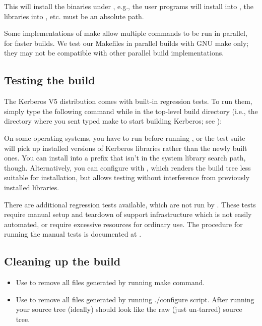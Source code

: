 \documentclass[letterpaper,10pt,english]{sphinxmanual}
\begin{document}
This will install the binaries under , e.g., the user
programs will install into , the libraries into
, etc.   must be an absolute path.

Some implementations of make allow multiple commands to be run in
parallel, for faster builds.  We test our Makefiles in parallel builds
with GNU make only; they may not be compatible with other parallel
build implementations.


\subsection{Testing the build}
\label{\detokenize{build/doing_build:testing-the-build}}
The Kerberos V5 distribution comes with built-in regression tests.  To
run them, simply type the following command while in the top-level
build directory (i.e., the directory where you sent typed make to
start building Kerberos; see {\hyperref[\detokenize{build/doing_build:do-build}]{}}):

%
\begin{sphinxVerbatim}[commandchars=\\\{\}]
 
\end{sphinxVerbatim}

On some operating systems, you have to run  before
running , or the test suite will pick up installed
versions of Kerberos libraries rather than the newly built ones.  You
can install into a prefix that isn’t in the system library search
path, though.  Alternatively, you can configure with
\sphinxstylestrong{-}, which renders the build tree less suitable
for installation, but allows testing without interference from
previously installed libraries.

There are additional regression tests available, which are not run
by .  These tests require manual setup and teardown of
support infrastructure which is not easily automated, or require
excessive resources for ordinary use.  The procedure for running
the manual tests is documented at
.


\subsection{Cleaning up the build}
\label{\detokenize{build/doing_build:cleaning-up-the-build}}\begin{itemize}
\item {} 
Use  to remove all files generated by running make
command.

\item {} 
Use  to remove all files generated by running
./configure script.  After running  your source
tree (ideally) should look like the raw (just un-tarred) source
tree.

\end{itemize}
\end{document}
